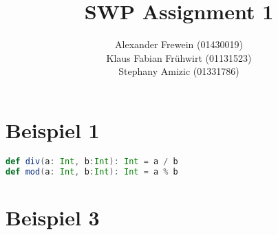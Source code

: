 \documentclass[12pt,runningheads,a4paper]{llncs}
\begin{document}
\title{SWP Assignment 1}


%
%
\author{Alexander Frewein (01430019)\\
		Klaus Fabian Frühwirt (01131523)\\
		Stephany Amizic (01331786)}

%




\maketitle




\bigskip
\bigskip
\section*{Beispiel 1}
\begin{lstlisting}[language=scala]
def div(a: Int, b:Int): Int = a / b
def mod(a: Int, b:Int): Int = a % b
\end{lstlisting}

\section*{Beispiel 3}
\end{document}
